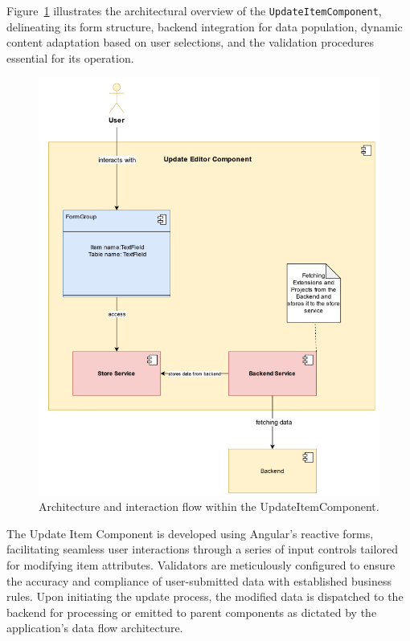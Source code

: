 Figure~\ref{fig:updateitem_component} illustrates the architectural overview of the \texttt{UpdateItemComponent}, delineating its form structure, backend integration for data population, dynamic content adaptation based on user selections, and the validation procedures essential for its operation.

\begin{figure}[H]
    \centering
    \includegraphics[width=\textwidth]{./images/frontend/update-item-component}
    \caption{Architecture and interaction flow within the UpdateItemComponent.}
    \label{fig:updateitem_component}
\end{figure}

The Update Item Component is developed using Angular's reactive forms, facilitating seamless user interactions through a series of input controls tailored for modifying item attributes.
Validators are meticulously configured to ensure the accuracy and compliance of user-submitted data with established business rules.
Upon initiating the update process, the modified data is dispatched to the backend for processing or emitted to parent components as dictated by the application's data flow architecture.

